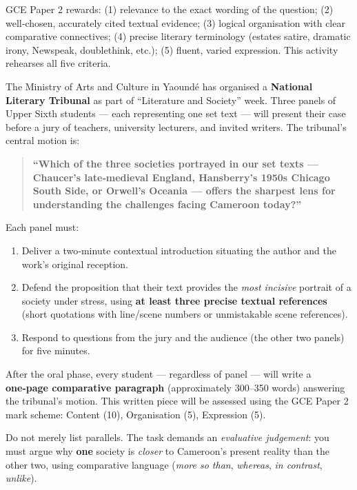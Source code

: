 \documentclass[11pt]{article}
\newcounter{popsec}
\newcounter{popsub}
\newcommand{\courssub}[1]{%
  \stepcounter{popsub}%
  \par\vspace{9pt}\noindent{\popxbold\fontsize{11.5}{13}\selectfont\color{popink}{\color{poporange}\thepopsec.\thepopsub}\hspace{6pt}#1}\par\nopagebreak\vspace{4pt}
}
\begin{document}
\begin{aretenir}
GCE Paper 2 rewards: (1) relevance to the exact wording of the question; (2) well‑chosen, accurately cited textual evidence; (3) logical organisation with clear comparative connectives; (4) precise literary terminology (estates satire, dramatic irony, Newspeak, doublethink, etc.); (5) fluent, varied expression. This activity rehearses all five criteria.
\end{aretenir}

\courssub{Situation}
The Ministry of Arts and Culture in Yaoundé has organised a \textbf{National Literary Tribunal} as part of “Literature and Society” week. Three panels of Upper Sixth students — each representing one set text — will present their case before a jury of teachers, university lecturers, and invited writers. The tribunal’s central motion is:

\begin{quote}
\textbf{“Which of the three societies portrayed in our set texts — Chaucer’s late‑medieval England, Hansberry’s 1950s Chicago South Side, or Orwell’s Oceania — offers the sharpest lens for understanding the challenges facing Cameroon today?”}
\end{quote}

Each panel must:
\begin{enumerate}
    \item Deliver a two‑minute contextual introduction situating the author and the work’s original reception.
    \item Defend the proposition that their text provides the \emph{most incisive} portrait of a society under stress, using \textbf{at least three precise textual references} (short quotations with line/scene numbers or unmistakable scene references).
    \item Respond to questions from the jury and the audience (the other two panels) for five minutes.
\end{enumerate}

After the oral phase, every student — regardless of panel — will write a \textbf{one‑page comparative paragraph} (approximately 300–350 words) answering the tribunal’s motion. This written piece will be assessed using the GCE Paper 2 mark scheme: Content (10), Organisation (5), Expression (5).

\begin{attention}
Do not merely list parallels. The task demands an \emph{evaluative judgement}: you must argue why \textbf{one} society is \emph{closer} to Cameroon’s present reality than the other two, using comparative language (\emph{more so than}, \emph{whereas}, \emph{in contrast}, \emph{unlike}).
\end{attention}
\end{document}
